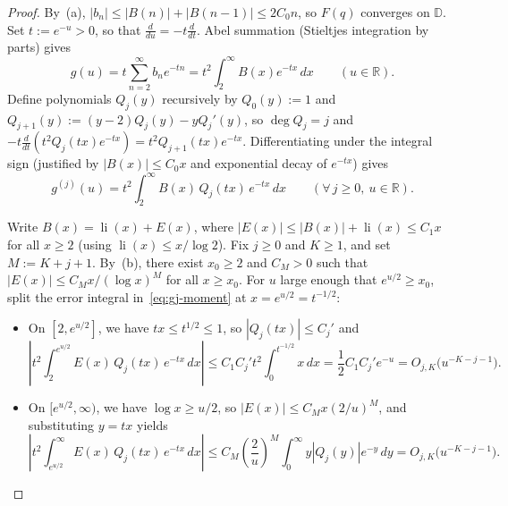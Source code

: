 \documentclass[10pt,reqno]{amsart}
\numberwithin{equation}{section}
\theoremstyle{definition}
\newcommand{\R}{\mathbb{R}}
\newcommand{\D}{\mathbb{D}}
\DeclareMathOperator{\li}{li}
\begin{document}
\begin{proof}
By~(a), $|b_n| \le |B(n)| + |B(n-1)| \le 2 C_0 n$, so $F(q)$ converges on $\D$. Set $t := e^{-u} > 0$, so that $\frac{d}{du} = -t\frac{d}{dt}$. Abel summation (Stieltjes integration by parts) gives
\[
  g(u) = t \sum_{n=2}^\infty b_n e^{-tn} = t^2 \int_2^\infty B(x) e^{-tx}\,dx \qquad (u \in \R).
\]
Define polynomials $Q_j(y)$ recursively by $Q_0(y) := 1$ and $Q_{j+1}(y) := (y - 2)Q_j(y) - y Q_j'(y)$, so $\deg Q_j = j$ and $-t\frac{d}{dt}(t^2 Q_j(tx) e^{-tx}) = t^2 Q_{j+1}(tx) e^{-tx}$. Differentiating under the integral sign (justified by $|B(x)| \le C_0 x$ and exponential decay of $e^{-tx}$) gives
\begin{equation}\label{eq:gj-moment}
  g^{(j)}(u) = t^2 \int_2^\infty B(x)\, Q_j(tx)\, e^{-tx}\,dx \qquad (\forall\, j \ge 0,\ u \in \R).
\end{equation}

Write $B(x) = \li(x) + E(x)$, where $|E(x)| \le |B(x)| + \li(x) \le C_1 x$ for all $x \ge 2$ (using $\li(x) \le x/\log 2$). Fix $j \ge 0$ and $K \ge 1$, and set $M := K + j + 1$. By~(b), there exist $x_0 \ge 2$ and $C_M > 0$ such that $|E(x)| \le C_M x / (\log x)^M$ for all $x \ge x_0$. For $u$ large enough that $e^{u/2} \ge x_0$, split the error integral in~\eqref{eq:gj-moment} at $x = e^{u/2} = t^{-1/2}$:
\begin{itemize}
  \item On $[2, e^{u/2}]$, we have $tx \le t^{1/2} \le 1$, so $|Q_j(tx)| \le C_j'$ and
  \[
    \left|t^2 \int_2^{e^{u/2}} E(x)\, Q_j(tx)\, e^{-tx}\,dx\right|
    \le C_1 C_j' t^2 \int_0^{t^{-1/2}} x\,dx = \frac{1}{2} C_1 C_j' e^{-u} = O_{j,K}\bigl(u^{-K-j-1}\bigr).
  \]
  \item On $[e^{u/2}, \infty)$, we have $\log x \ge u/2$, so $|E(x)| \le C_M x (2/u)^M$, and substituting $y = tx$ yields
  \[
    \left|t^2 \int_{e^{u/2}}^\infty E(x)\, Q_j(tx)\, e^{-tx}\,dx\right|
    \le C_M \left(\frac{2}{u}\right)^M \int_0^\infty y |Q_j(y)| e^{-y}\,dy = O_{j,K}\bigl(u^{-K-j-1}\bigr).
  \]
\end{itemize}


\end{proof}
\end{document}
